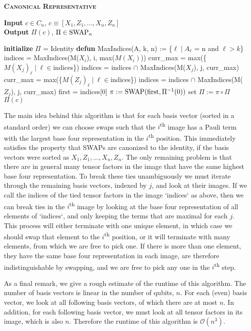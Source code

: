 \begin{algorithm}[H]
\caption*{\textsc{\textbf{Canonical Representative}}}
\hspace*{\algorithmicindent} \textbf{Input} $c\in C_n$, $c\equiv[X_1, Z_1, ..., X_n, Z_n]$\\
\hspace*{\algorithmicindent} \textbf{Output} $\Pi(c)$, $\Pi\in \operatorname{SWAP}_n$\\
\begin{algorithmic}
\State \textbf{initialize} $\Pi$ = Identity
    \State \textbf{defun} MaxIndices(A, k, n) := \{$\ell\mid A_\ell$ = n and $\ell >k$\}
    \State indices = MaxIndices(M($X_i$), i, max($M(X_i)$))
        \State curr\_max = max(\{$M(X_j)_\ell\mid\ell\in$indices\})
        \State indices = indices $\cap$ MaxIndices(M($X_j$), j, curr\_max)
        \State curr\_max = max(\{$M(Z_j)_\ell\mid\ell\in$indices\})
        \State indices = indices $\cap$ MaxIndices(M($Z_j$), j, curr\_max)
    \EndFor
    \State first = indices[0]
    \State $\pi := \operatorname{SWAP}(\textrm{first}, \Pi^{-1}(0))$
    \State set $\Pi := \pi\circ\Pi$
\EndFor
\State \Return $\Pi(c)$

\end{algorithmic}
\end{algorithm}


The main idea behind this algorithm is that for each basis vector (sorted in a standard order) we can choose swaps such that the $i$\textsuperscript{th} image has a Pauli term with the largest base four representation in the $i$\textsuperscript{th} position. This immediately satisfies the property that SWAPs are canonized to the identity, if the basis vectors were sorted as $X_1, Z_1, ..., X_n, Z_n$. The only remaining problem is that there are in general many tensor factors in the image that have the same highest base four representation. To break these ties unambiguously we must iterate through the remaining basis vectors, indexed by $j$, and look at their images. If we call the indices of the tied tensor factors in the image `indices` as above, then we can break ties in the $i$\textsuperscript{th} image by looking at the base four representation of all elements of `indices`, and only keeping the terms that are maximal for each $j$. This process will either terminate with one unique element, in which case we should swap that element to the $i$\textsuperscript{th} position, or it will terminate with many elements, from which we are free to pick one. If there is more than one element, they have the same base four representation in each image, are therefore indistinguishable by swapping, and we are free to pick any one in the $i$\textsuperscript{th} step.

As a final remark, we give a rough estimate of the runtime of this algorithm. The number of basis vectors is linear in the number of qubits, $n$. For each (even) basis vector, we look at all following basis vectors, of which there are at most $n$. In addition, for each following basis vector, we must look at all tensor factors in its image, which is also $n$. Therefore the runtime of this algorithm is $\mathcal{O}(n^3)$.
